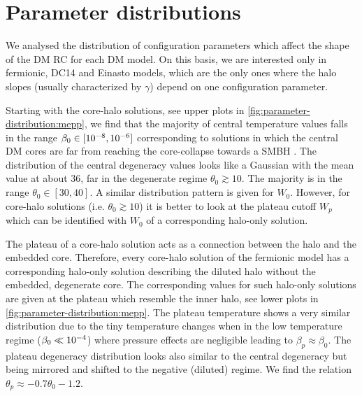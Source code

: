 \section{Parameter distributions}
\label{sec:appendix:parameter-distribution}



We analysed the distribution of configuration parameters which affect the shape of the DM RC for each DM model. On this basis, we are interested only in fermionic, DC14 and Einasto models, which are the only ones where the halo slopes (usually characterized by $\gamma$) depend on one configuration parameter.

Starting with the core-halo solutions, see upper plots in \cref{fig:parameter-distribution:mepp}, we find that the majority of central temperature values falls in the range $\beta_0 \in [\num{E-8}, \num{E-6}]$ corresponding to solutions in which the central DM cores are far from reaching the core-collapse towards a SMBH \citep{2019PDU....24..278A,2021MNRAS.502.4227A}. The distribution of the central degeneracy values looks like a Gaussian with the mean value at about 36, far in the degenerate regime $\theta_0 \gtrsim 10$. The majority is in the range $\theta_0 \in [30, 40]$. A similar distribution pattern is given for $W_0$. However, for core-halo solutions (i.e. $\theta_0 \gtrsim 10$) it is better to look at the plateau cutoff $W_p$ which can be identified with $W_0$ of a corresponding halo-only solution.


The plateau of a core-halo solution acts as a connection between the halo and the embedded core. Therefore, every core-halo solution of the fermionic model has a corresponding halo-only solution describing the diluted halo without the embedded, degenerate core. The corresponding values for such halo-only solutions are given at the plateau which resemble the inner halo, see lower plots in \cref{fig:parameter-distribution:mepp}. The plateau temperature shows a very similar distribution due to the tiny temperature changes when in the low temperature regime ($\beta_0 \ll \num{E-4}$) where pressure effects are negligible leading to $\beta_p \approx \beta_0$. The plateau degeneracy distribution looks also similar to the central degeneracy but being mirrored and shifted to the negative (diluted) regime. We find the relation $\theta_p \approx -0.7 \theta_0 - 1.2$.


